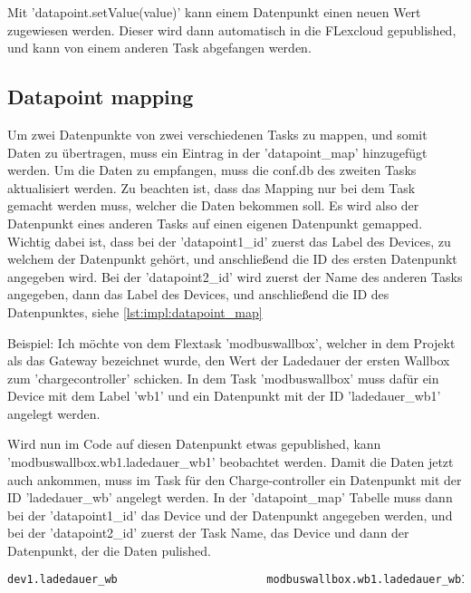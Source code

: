 Mit 'datapoint.setValue(value)' kann einem Datenpunkt einen neuen Wert zugewiesen werden. Dieser wird dann automatisch in die FLexcloud gepublished, und kann von einem anderen Task abgefangen werden.


\subsection{Datapoint mapping} 

Um zwei Datenpunkte von zwei verschiedenen Tasks zu mappen, und somit Daten zu übertragen, muss  ein Eintrag in der 'datapoint\_map' hinzugefügt werden. Um die Daten zu empfangen, muss die conf.db des zweiten Tasks aktualisiert werden. Zu beachten ist, dass das Mapping nur bei dem Task gemacht werden muss, welcher die Daten bekommen soll. Es wird also der Datenpunkt eines anderen Tasks auf einen eigenen Datenpunkt gemapped. Wichtig dabei ist, dass bei der 'datapoint1\_id' zuerst das Label des Devices, zu welchem der Datenpunkt gehört, und anschließend die ID des ersten Datenpunkt angegeben wird. Bei der 'datapoint2\_id' wird zuerst der Name des anderen Tasks angegeben, dann das Label des Devices, und anschließend die ID des Datenpunktes, siehe \ref{lst:impl:datapoint_map}



Beispiel: Ich möchte von dem Flextask 'modbuswallbox', welcher in dem Projekt als das Gateway bezeichnet wurde, den Wert der Ladedauer der ersten Wallbox zum 'chargecontroller' schicken. In dem Task 'modbuswallbox' muss dafür ein Device mit dem Label 'wb1' und ein Datenpunkt mit der ID 'ladedauer\_wb1' angelegt werden. 

Wird nun im Code auf diesen Datenpunkt etwas gepublished, kann \newline'modbuswallbox.wb1.ladedauer\_wb1' beobachtet werden. Damit die Daten jetzt auch ankommen, muss im Task für den Charge-controller ein Datenpunkt mit der ID 'ladedauer\_wb' angelegt werden. In der 'datapoint\_map' Tabelle muss dann bei der 'datapoint1\_id' das Device und der Datenpunkt angegeben werden, und bei der 'datapoint2\_id' zuerst der Task Name, das Device und dann der Datenpunkt, der die Daten pulished.

\begin{lstlisting}[language=sql,caption=Eintrag in die datapoint\_map Tabelle,label=lst:impl:datapoint_map]
    dev1.ladedauer_wb                       modbuswallbox.wb1.ladedauer_wb1
\end{lstlisting}